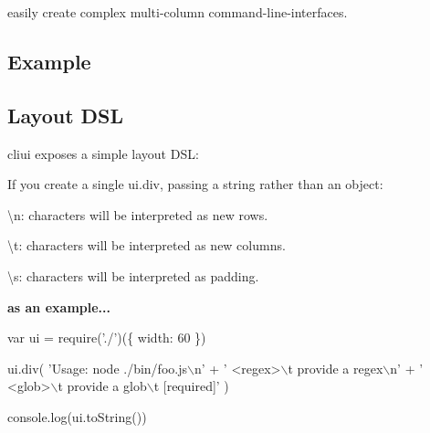 \href{https://travis-ci.org/yargs/cliui}{\tt } \href{https://coveralls.io/r/yargs/cliui?branch=}{\tt } \href{https://www.npmjs.com/package/cliui}{\tt } \href{https://github.com/conventional-changelog/standard-version}{\tt }

easily create complex multi-\/column command-\/line-\/interfaces.

\subsection*{Example}






\subsection*{Layout D\+SL}

cliui exposes a simple layout D\+SL\+:

If you create a single {\ttfamily ui.\+div}, passing a string rather than an object\+:


\begin{DoxyItemize}
\item {\ttfamily \textbackslash{}n}\+: characters will be interpreted as new rows.
\item {\ttfamily \textbackslash{}t}\+: characters will be interpreted as new columns.
\item {\ttfamily \textbackslash{}s}\+: characters will be interpreted as padding.
\end{DoxyItemize}

{\bfseries as an example...}


\begin{DoxyCode}
var ui = require('./')(\{
  width: 60
\})

ui.div(
  'Usage: node ./bin/foo.js\(\backslash\)n' +
  '  <regex>\(\backslash\)t  provide a regex\(\backslash\)n' +
  '  <glob>\(\backslash\)t  provide a glob\(\backslash\)t [required]'
)

console.log(ui.toString())
\end{DoxyCode}


